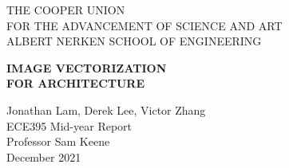 \begin{titlepage}
   \begin{center}
        
        \Large
        
        THE COOPER UNION \\
        FOR THE ADVANCEMENT OF SCIENCE AND ART\\
        ALBERT NERKEN SCHOOL OF ENGINEERING
        
        \vspace{4cm}
        \textbf{\LARGE \uppercase{Image Vectorization\\for Architecture}}
        
        \vspace{4cm}
        Jonathan Lam, Derek Lee, Victor Zhang\\
        
        \vspace{4cm}
        ECE395 Mid-year Report\\
        Professor Sam Keene\\
        December 2021
        
        \vfill
        
        \normalsize
   \end{center}
\end{titlepage}
